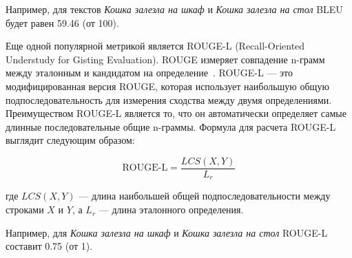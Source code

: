 \documentclass[LI,VKR]{HSEUniversity}
\begin{document}
Например, для текстов \textit{Кошка залезла на шкаф} и \textit{Кошка залезла на стол} BLEU будет равен 59.46 (от 100).

%
%
%
%
%
%
%
%
%
%
%


Еще одной популярной метрикой является ROUGE-L (Recall-Oriented Understudy for Gisting Evaluation).
ROUGE измеряет совпадение n-грамм между эталонным и кандидатом на определение~\cite{ROUGE}.
ROUGE-L — это модифицированная версия ROUGE, которая использует наибольшую общую подпоследовательность
для измерения сходства между двумя определениями.
Преимуществом ROUGE-L является то, что он автоматически определяет самые длинные последовательные общие n-граммы.
Формула для расчета ROUGE-L выглядит следующим образом:

\begin{equation}
\text{ROUGE-L} = \frac{LCS(X, Y)}{L_r}
\end{equation}

где $LCS(X, Y)$ — длина наибольшей общей подпоследовательности между строками $X$ и $Y$, а $L_r$ — длина эталонного определения.

Например, для \textit{Кошка залезла на шкаф} и \textit{Кошка залезла на стол} ROUGE-L составит 0.75 (от 1).
\end{document}
